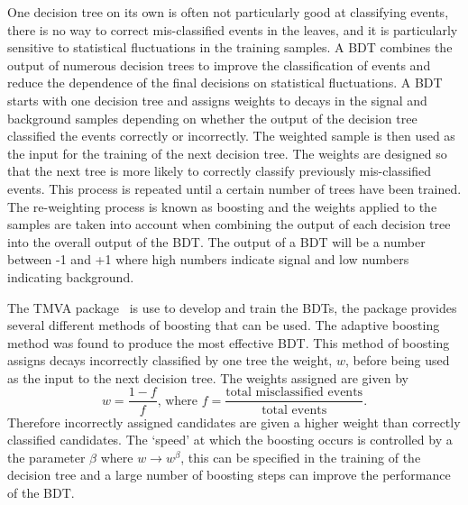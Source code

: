 One decision tree on its own is often not particularly good at classifying events, there is no way to correct mis-classified events in the leaves, and it is particularly sensitive to statistical fluctuations in the training samples. A BDT combines the output of numerous decision trees to improve the classification of events and reduce the dependence of the final decisions on statistical fluctuations. A BDT starts with one decision tree and assigns weights to decays in the signal and background samples depending on whether the output of the decision tree classified the events correctly or incorrectly. The weighted sample is then used as the input for the training of the next decision tree. The weights are designed so that the next tree is more likely to correctly classify previously mis-classified events. This process is repeated until a certain number of trees have been trained. The re-weighting process is known as boosting and the weights applied to the samples are taken into account when combining the output of each decision tree into the overall output of the BDT. The output of a BDT will be a number between -1 and +1 where high numbers indicate signal and low numbers indicating background.


The TMVA package~\cite{Hocker:2007ht} is use to develop and train the BDTs, the package provides several different methods of boosting that can be used. The adaptive boosting method was found to produce the most effective BDT.
This method of boosting assigns decays incorrectly classified by one tree the weight, $w$, before being used as the input to the next decision tree. The weights assigned are given by
\begin{equation}
w = \frac{1 - f}{f}\text{, where } f = \frac{\text{total misclassified events}}{\text{total events}}.
\end{equation}
Therefore incorrectly assigned candidates are given a higher weight than correctly classified candidates. The `speed’ at which the boosting occurs is controlled by a the parameter $\beta$ where $w \rightarrow w^{\beta}$, this can be specified in the training of the decision tree and a large number of boosting steps can improve the performance of the BDT.

